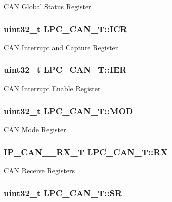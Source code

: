 C\-A\-N Global Status Register \hypertarget{structLPC__CAN__T_a8ccbac222a59bb6da7ba81f8394dbb2e}{
\subsubsection[{I\-C\-R}]{ uint32\-\_\-t L\-P\-C\-\_\-\-C\-A\-N\-\_\-\-T\-::\-I\-C\-R}}\label{structLPC__CAN__T_a8ccbac222a59bb6da7ba81f8394dbb2e}
C\-A\-N Interrupt and Capture Register \hypertarget{structLPC__CAN__T_a2ab9628e17449ba6a3bfa9c8479c2e8a}{
\subsubsection[{I\-E\-R}]{ uint32\-\_\-t L\-P\-C\-\_\-\-C\-A\-N\-\_\-\-T\-::\-I\-E\-R}}\label{structLPC__CAN__T_a2ab9628e17449ba6a3bfa9c8479c2e8a}
C\-A\-N Interrupt Enable Register \hypertarget{structLPC__CAN__T_a8bc39ce9227ace84de55a902d60cb11e}{
\subsubsection[{M\-O\-D}]{ uint32\-\_\-t L\-P\-C\-\_\-\-C\-A\-N\-\_\-\-T\-::\-M\-O\-D}}\label{structLPC__CAN__T_a8bc39ce9227ace84de55a902d60cb11e}
C\-A\-N Mode Register \hypertarget{structLPC__CAN__T_a9890a3ed561ea1e0fbce9a2d6321ac39}{
\subsubsection[{R\-X}]{ {\bf I\-P\-\_\-\-C\-A\-N\-\_\-\_\-\-R\-X\-\_\-\-T} L\-P\-C\-\_\-\-C\-A\-N\-\_\-\-T\-::\-R\-X}}\label{structLPC__CAN__T_a9890a3ed561ea1e0fbce9a2d6321ac39}
C\-A\-N Receive Registers \hypertarget{structLPC__CAN__T_a16d0fa727f1fbcff03739b512b00806d}{
\subsubsection[{S\-R}]{ uint32\-\_\-t L\-P\-C\-\_\-\-C\-A\-N\-\_\-\-T\-::\-S\-R}}\label{structLPC__CAN__T_a16d0fa727f1fbcff03739b512b00806d}
